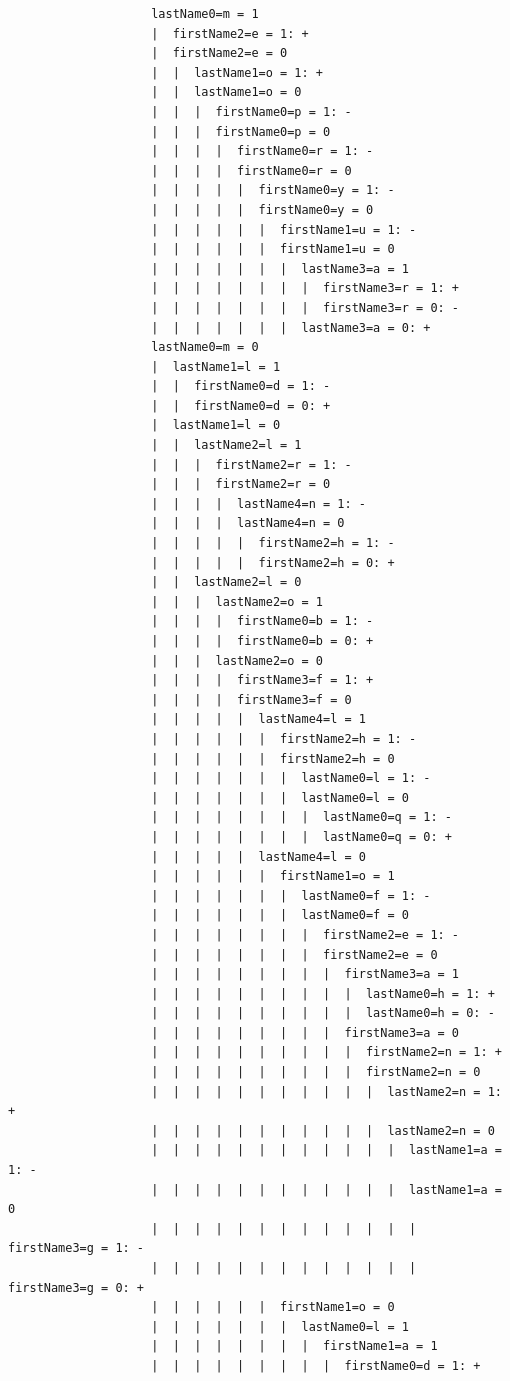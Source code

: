\begin{enumerate}
\begin{itemize}
\begin{itemize}
\begin{verbatim}
					lastName0=m = 1
					|  firstName2=e = 1: +
					|  firstName2=e = 0
					|  |  lastName1=o = 1: +
					|  |  lastName1=o = 0
					|  |  |  firstName0=p = 1: -
					|  |  |  firstName0=p = 0
					|  |  |  |  firstName0=r = 1: -
					|  |  |  |  firstName0=r = 0
					|  |  |  |  |  firstName0=y = 1: -
					|  |  |  |  |  firstName0=y = 0
					|  |  |  |  |  |  firstName1=u = 1: -
					|  |  |  |  |  |  firstName1=u = 0
					|  |  |  |  |  |  |  lastName3=a = 1
					|  |  |  |  |  |  |  |  firstName3=r = 1: +
					|  |  |  |  |  |  |  |  firstName3=r = 0: -
					|  |  |  |  |  |  |  lastName3=a = 0: +
					lastName0=m = 0
					|  lastName1=l = 1
					|  |  firstName0=d = 1: -
					|  |  firstName0=d = 0: +
					|  lastName1=l = 0
					|  |  lastName2=l = 1
					|  |  |  firstName2=r = 1: -
					|  |  |  firstName2=r = 0
					|  |  |  |  lastName4=n = 1: -
					|  |  |  |  lastName4=n = 0
					|  |  |  |  |  firstName2=h = 1: -
					|  |  |  |  |  firstName2=h = 0: +
					|  |  lastName2=l = 0
					|  |  |  lastName2=o = 1
					|  |  |  |  firstName0=b = 1: -
					|  |  |  |  firstName0=b = 0: +
					|  |  |  lastName2=o = 0
					|  |  |  |  firstName3=f = 1: +
					|  |  |  |  firstName3=f = 0
					|  |  |  |  |  lastName4=l = 1
					|  |  |  |  |  |  firstName2=h = 1: -
					|  |  |  |  |  |  firstName2=h = 0
					|  |  |  |  |  |  |  lastName0=l = 1: -
					|  |  |  |  |  |  |  lastName0=l = 0
					|  |  |  |  |  |  |  |  lastName0=q = 1: -
					|  |  |  |  |  |  |  |  lastName0=q = 0: +
					|  |  |  |  |  lastName4=l = 0
					|  |  |  |  |  |  firstName1=o = 1
					|  |  |  |  |  |  |  lastName0=f = 1: -
					|  |  |  |  |  |  |  lastName0=f = 0
					|  |  |  |  |  |  |  |  firstName2=e = 1: -
					|  |  |  |  |  |  |  |  firstName2=e = 0
					|  |  |  |  |  |  |  |  |  firstName3=a = 1
					|  |  |  |  |  |  |  |  |  |  lastName0=h = 1: +
					|  |  |  |  |  |  |  |  |  |  lastName0=h = 0: -
					|  |  |  |  |  |  |  |  |  firstName3=a = 0
					|  |  |  |  |  |  |  |  |  |  firstName2=n = 1: +
					|  |  |  |  |  |  |  |  |  |  firstName2=n = 0
					|  |  |  |  |  |  |  |  |  |  |  lastName2=n = 1: +
					|  |  |  |  |  |  |  |  |  |  |  lastName2=n = 0
					|  |  |  |  |  |  |  |  |  |  |  |  lastName1=a = 1: -
					|  |  |  |  |  |  |  |  |  |  |  |  lastName1=a = 0
					|  |  |  |  |  |  |  |  |  |  |  |  |  firstName3=g = 1: -
					|  |  |  |  |  |  |  |  |  |  |  |  |  firstName3=g = 0: +
					|  |  |  |  |  |  firstName1=o = 0
					|  |  |  |  |  |  |  lastName0=l = 1
					|  |  |  |  |  |  |  |  firstName1=a = 1
					|  |  |  |  |  |  |  |  |  firstName0=d = 1: +

\end{verbatim}
\end{itemize}
\end{itemize}
\end{enumerate}
